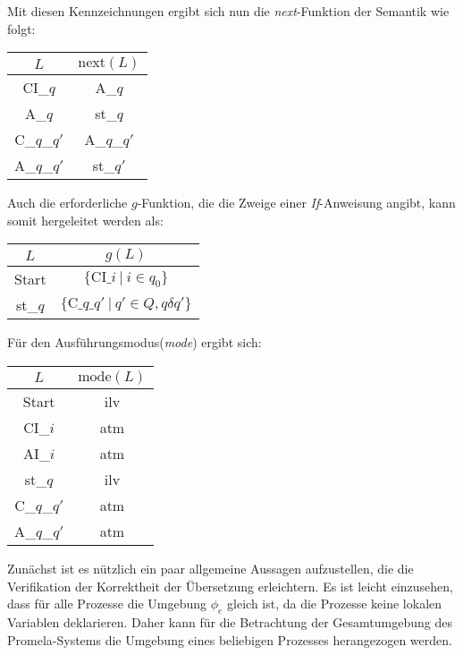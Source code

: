 Mit diesen Kennzeichnungen ergibt sich nun die \emph{next}-Funktion der Semantik wie folgt:

\begin{tabular}{|c|c|}
  \hline
  $L$ & $\textrm{next}(L)$\\
  \hline
  CI\_$q$ & A\_$q$\\
  A\_$q$ & st\_$q$\\
  C\_$q$\_$q'$ & A\_$q$\_$q'$\\
  A\_$q$\_$q'$ & st\_$q'$\\
  \hline
\end{tabular}

Auch die erforderliche $g$-Funktion, die die Zweige einer \emph{If}-Anweisung angibt, kann somit hergeleitet werden als:

\begin{tabular}{|c|c|}
  \hline
  $L$ & $g(L)$\\
  \hline
  Start & $\{ \textrm{CI\_}i\ |\ i\in q_0 \}$\\
  st\_$q$ & $\{ \textrm{C\_}q\textrm{\_}q'\ |\ q'\in Q, q\delta q' \}$\\
  \hline
\end{tabular}

Für den Ausführungsmodus(\emph{mode}) ergibt sich:

\begin{tabular}{|c|c|}
  \hline
  $L$ & $\textrm{mode}(L)$\\
  \hline
  Start & ilv\\
  CI\_$i$ & atm\\
  AI\_$i$ & atm\\
  st\_$q$ & ilv\\
  C\_$q$\_$q'$ & atm\\
  A\_$q$\_$q'$ & atm\\
  \hline
\end{tabular}

Zunächst ist es nützlich ein paar allgemeine Aussagen aufzustellen, die die Verifikation der Korrektheit der Übersetzung erleichtern.
Es ist leicht einzusehen, dass für alle Prozesse die Umgebung $\phi_e$ gleich ist, da die Prozesse keine lokalen Variablen deklarieren.
Daher kann für die Betrachtung der Gesamtumgebung des Promela-Systems die Umgebung eines beliebigen Prozesses herangezogen werden.

